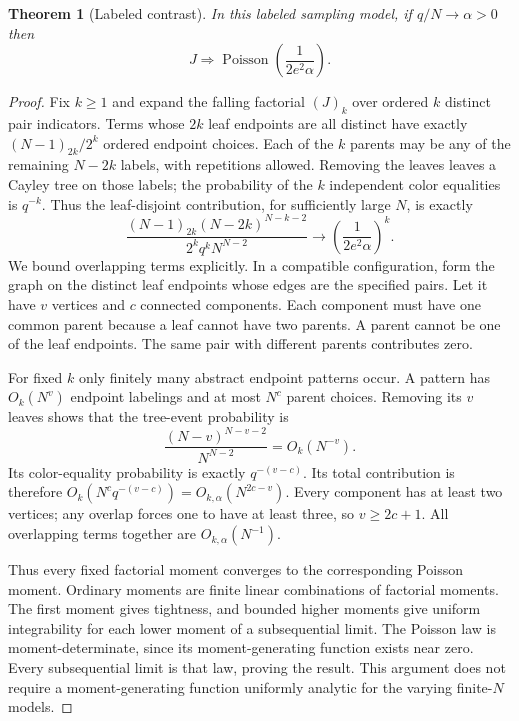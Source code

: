 \documentclass[11pt]{article}
\newtheorem{theorem}{Theorem}[section]
\theoremstyle{definition}
\begin{document}
\begin{theorem}[Labeled contrast]\label{mct:thm:labeled}
In this labeled sampling model, if $q/N\to\alpha>0$ then
\[
 J\Longrightarrow\operatorname{Poisson}\left(\frac{1}{2e^2\alpha}\right).
\]
\end{theorem}
\begin{proof}
Fix $k\ge1$ and expand the falling factorial $(J)_k$ over ordered $k$ distinct pair indicators. Terms whose $2k$ leaf endpoints are all distinct have exactly $(N-1)_{2k}/2^k$ ordered endpoint choices. Each of the $k$ parents may be any of the remaining $N-2k$ labels, with repetitions allowed. Removing the leaves leaves a Cayley tree on those labels; the probability of the $k$ independent color equalities is $q^{-k}$. Thus the leaf-disjoint contribution, for sufficiently large $N$, is exactly
\begin{equation}\label{mct:eq:disjoint}
 \frac{(N-1)_{2k}(N-2k)^{N-k-2}}{2^kq^kN^{N-2}}
 \longrightarrow\left(\frac{1}{2e^2\alpha}\right)^k.
\end{equation}
We bound overlapping terms explicitly. In a compatible configuration, form the graph on the distinct leaf endpoints whose edges are the specified pairs. Let it have $v$ vertices and $c$ connected components. Each component must have one common parent because a leaf cannot have two parents. A parent cannot be one of the leaf endpoints. The same pair with different parents contributes zero.

For fixed $k$ only finitely many abstract endpoint patterns occur. A pattern has $O_k(N^v)$ endpoint labelings and at most $N^c$ parent choices. Removing its $v$ leaves shows that the tree-event probability is
\[
 \frac{(N-v)^{N-v-2}}{N^{N-2}}=O_k(N^{-v}).
\]
Its color-equality probability is exactly $q^{-(v-c)}$. Its total contribution is therefore $O_k(N^cq^{-(v-c)})=O_{k,\alpha}(N^{2c-v})$. Every component has at least two vertices; any overlap forces one to have at least three, so $v\ge2c+1$. All overlapping terms together are $O_{k,\alpha}(N^{-1})$.

Thus every fixed factorial moment converges to the corresponding Poisson moment. Ordinary moments are finite linear combinations of factorial moments. The first moment gives tightness, and bounded higher moments give uniform integrability for each lower moment of a subsequential limit. The Poisson law is moment-determinate, since its moment-generating function exists near zero. Every subsequential limit is that law, proving the result. This argument does not require a moment-generating function uniformly analytic for the varying finite-$N$ models.
\end{proof}
\end{document}
